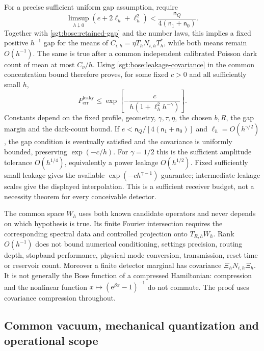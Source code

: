 \documentclass[aps,pra,reprint,superscriptaddress,longbibliography]{revtex4-2}
\newcommand{\ee}{\mathrm e}
\begin{document}
For a precise sufficient uniform gap assumption, require
\begin{equation}
 \limsup_{h\downarrow0}(e+2\ell_h+\ell_h^2)
       <\frac{\mathsf n_Q}{4(\mathsf n_1+\mathsf n_0)}.
 \label{sgt:bose:leakage-gap}
\end{equation}
Together with \eqref{sgt:bose:retained-gap} and the number laws, this
implies a fixed positive $h^{-1}$ gap for the means of
$C_{i,h}=\eta T_hN_{i,h}T_h^*$, while both means remain $O(h^{-1})$.
The same is true after a common independent calibrated Poisson dark
count of mean at most $C_\nu/h$.  Using
\eqref{sgt:bose:leakage-covariance} in the common concentration bound
therefore proves, for some fixed $c>0$ and all sufficiently small $h$,
\begin{equation}
 P_{\mathrm{err}}^{\mathrm{leaky}}
  \le\exp\!\left[-\frac{c}
           {h(1+\ell_h^2h^{-\gamma})}\right].
 \label{sgt:bose:leakage-rate}
\end{equation}
Constants depend on the fixed profile, geometry, $\gamma,\tau,\eta$,
the chosen $b,R$, the gap margin and the dark-count bound.
If $e<\mathsf n_Q/[4(\mathsf n_1+\mathsf n_0)]$ and
$\ell_h=O(h^{\gamma/2})$, the gap condition is eventually satisfied
and the covariance is uniformly bounded, preserving
$\exp(-c/h)$.  For $\gamma=1/2$ this is the sufficient amplitude
tolerance $O(h^{1/4})$, equivalently a power leakage $O(h^{1/2})$.
Fixed sufficiently small leakage gives the available
$\exp(-c h^{\gamma-1})$ guarantee; intermediate leakage scales give
the displayed interpolation.  This is a sufficient receiver budget,
not a necessity theorem for every conceivable detector.

The common space $W_h$ uses both known candidate operators and never
depends on which hypothesis is true.  Its finite Fourier intersection
requires the corresponding spectral data and controlled projection
onto $T_{R,h}W_h$.  Rank $O(h^{-1})$ does not bound numerical conditioning,
settings precision, routing depth, stopband performance, physical mode
conversion, transmission, reset time or reservoir count.  Moreover a
finite detector marginal has covariance $\Xi_hN_{i,h}\Xi_h$.
It is not generally the Bose function of a compressed Hamiltonian:
compression and the nonlinear function $x\mapsto(\ee^{\beta x}-1)^{-1}$
do not commute.  The proof uses covariance compression throughout.

\subsection{Common vacuum, mechanical quantization and operational scope}
\label{sgt:bose:physical-scope}
\end{document}
